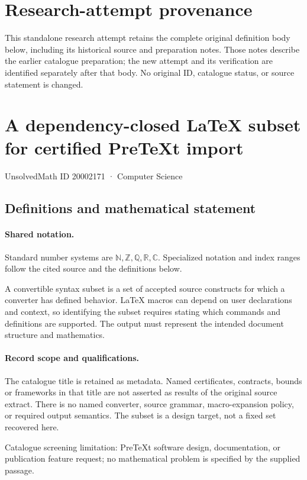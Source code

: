 \documentclass[11pt]{article}
\begin{document}
\section*{Research-attempt provenance}
This standalone research attempt retains the complete original definition body below,
including its historical source and preparation notes. Those notes describe the
earlier catalogue preparation; the new attempt and its verification are identified
separately after that body. No original ID, catalogue status, or source statement is changed.

\section{A dependency-closed LaTeX subset for certified PreTeXt import}\label{20002171}
{\small UnsolvedMath ID 20002171 · Computer Science}
\subsection{Definitions and mathematical statement}

\paragraph{Shared notation.}Standard number systems are $\mathbb N,\mathbb Z,\mathbb Q,\mathbb R,\mathbb C$. Specialized notation and index ranges follow the cited source and the definitions below.


A convertible syntax subset is a set of accepted source constructs for which a converter has defined behavior. LaTeX macros can depend on user declarations and context, so identifying the subset requires stating which commands and definitions are supported. The output must represent the intended document structure and mathematics.
\paragraph{Record scope and qualifications.}
The catalogue title is retained as metadata. Named certificates, contracts, bounds or frameworks in that title are not asserted as results of the original source extract.
There is no named converter, source grammar, macro-expansion policy, or required output semantics. The subset is a design target, not a fixed set recovered here.

Catalogue screening limitation: PreTeXt software design, documentation, or publication feature request; no mathematical problem is specified by the supplied passage.
\end{document}
